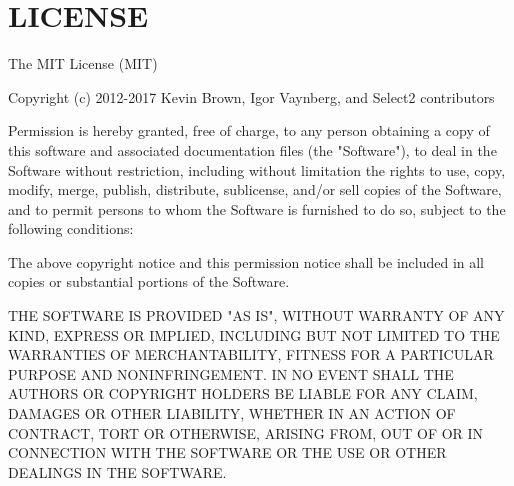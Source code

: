 \chapter{LICENSE}
\hypertarget{md_env_2lib_2python3_812_2site-packages_2django_2contrib_2admin_2static_2admin_2js_2vendor_2select2_2LICENSE}{}\label{md_env_2lib_2python3_812_2site-packages_2django_2contrib_2admin_2static_2admin_2js_2vendor_2select2_2LICENSE}
The MIT License (MIT)

Copyright (c) 2012-\/2017 Kevin Brown, Igor Vaynberg, and Select2 contributors

Permission is hereby granted, free of charge, to any person obtaining a copy of this software and associated documentation files (the "{}\+Software"{}), to deal in the Software without restriction, including without limitation the rights to use, copy, modify, merge, publish, distribute, sublicense, and/or sell copies of the Software, and to permit persons to whom the Software is furnished to do so, subject to the following conditions\+:

The above copyright notice and this permission notice shall be included in all copies or substantial portions of the Software.

THE SOFTWARE IS PROVIDED "{}\+AS IS"{}, WITHOUT WARRANTY OF ANY KIND, EXPRESS OR IMPLIED, INCLUDING BUT NOT LIMITED TO THE WARRANTIES OF MERCHANTABILITY, FITNESS FOR A PARTICULAR PURPOSE AND NONINFRINGEMENT. IN NO EVENT SHALL THE AUTHORS OR COPYRIGHT HOLDERS BE LIABLE FOR ANY CLAIM, DAMAGES OR OTHER LIABILITY, WHETHER IN AN ACTION OF CONTRACT, TORT OR OTHERWISE, ARISING FROM, OUT OF OR IN CONNECTION WITH THE SOFTWARE OR THE USE OR OTHER DEALINGS IN THE SOFTWARE. 